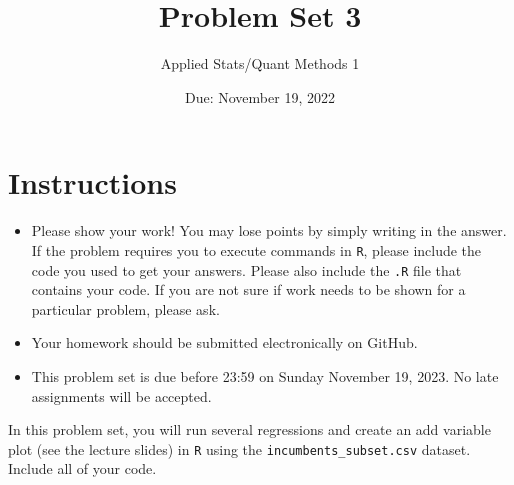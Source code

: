 \documentclass[12pt,letterpaper]{article}
\title{Problem Set 3}
\date{Due: November 19, 2022}
\author{Applied Stats/Quant Methods 1}
\begin{document}
	\maketitle
	\section*{Instructions}
	\begin{itemize}
		\item Please show your work! You may lose points by simply writing in the answer. If the problem requires you to execute commands in \texttt{R}, please include the code you used to get your answers. Please also include the \texttt{.R} file that contains your code. If you are not sure if work needs to be shown for a particular problem, please ask.
	\item Your homework should be submitted electronically on GitHub.
	\item This problem set is due before 23:59 on Sunday November 19, 2023. No late assignments will be accepted.

	\end{itemize}
	
\noindent In this problem set, you will run several regressions and create an add variable plot (see the lecture slides) in \texttt{R} using the \texttt{incumbents\_subset.csv} dataset. Include all of your code.
\end{document}
